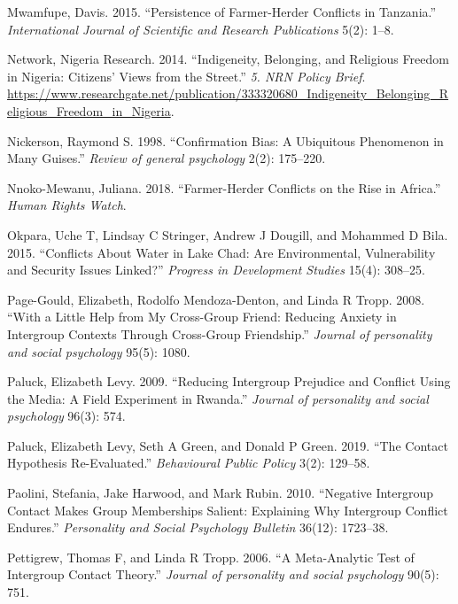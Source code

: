 \documentclass[11pt]{article}
\begin{document}
\begin{cslreferences}
\leavevmode\hypertarget{ref-mwamfupe2015persistence}{}%
Mwamfupe, Davis. 2015. ``Persistence of Farmer-Herder Conflicts in
Tanzania.'' \emph{International Journal of Scientific and Research
Publications} 5(2): 1--8.

\leavevmode\hypertarget{ref-nigeria2014freedom}{}%
Network, Nigeria Research. 2014. ``Indigeneity, Belonging, and Religious
Freedom in Nigeria: Citizens' Views from the Street.'' \emph{5. NRN
Policy Brief}.
\url{https://www.researchgate.net/publication/333320680_Indigeneity_Belonging_Religious_Freedom_in_Nigeria}.

\leavevmode\hypertarget{ref-nickerson1998confirmation}{}%
Nickerson, Raymond S. 1998. ``Confirmation Bias: A Ubiquitous Phenomenon
in Many Guises.'' \emph{Review of general psychology} 2(2): 175--220.

\leavevmode\hypertarget{ref-hrc2018farmer}{}%
Nnoko-Mewanu, Juliana. 2018. ``Farmer-Herder Conflicts on the Rise in
Africa.'' \emph{Human Rights Watch}.

\leavevmode\hypertarget{ref-okpara2015conflicts}{}%
Okpara, Uche T, Lindsay C Stringer, Andrew J Dougill, and Mohammed D
Bila. 2015. ``Conflicts About Water in Lake Chad: Are Environmental,
Vulnerability and Security Issues Linked?'' \emph{Progress in
Development Studies} 15(4): 308--25.

\leavevmode\hypertarget{ref-page2008little}{}%
Page-Gould, Elizabeth, Rodolfo Mendoza-Denton, and Linda R Tropp. 2008.
``With a Little Help from My Cross-Group Friend: Reducing Anxiety in
Intergroup Contexts Through Cross-Group Friendship.'' \emph{Journal of
personality and social psychology} 95(5): 1080.

\leavevmode\hypertarget{ref-paluck2009jsp}{}%
Paluck, Elizabeth Levy. 2009. ``Reducing Intergroup Prejudice and
Conflict Using the Media: A Field Experiment in Rwanda.'' \emph{Journal
of personality and social psychology} 96(3): 574.

\leavevmode\hypertarget{ref-paluck2019contact}{}%
Paluck, Elizabeth Levy, Seth A Green, and Donald P Green. 2019. ``The
Contact Hypothesis Re-Evaluated.'' \emph{Behavioural Public Policy}
3(2): 129--58.

\leavevmode\hypertarget{ref-paolini2010negative}{}%
Paolini, Stefania, Jake Harwood, and Mark Rubin. 2010. ``Negative
Intergroup Contact Makes Group Memberships Salient: Explaining Why
Intergroup Conflict Endures.'' \emph{Personality and Social Psychology
Bulletin} 36(12): 1723--38.

\leavevmode\hypertarget{ref-pettigrew2006meta}{}%
Pettigrew, Thomas F, and Linda R Tropp. 2006. ``A Meta-Analytic Test of
Intergroup Contact Theory.'' \emph{Journal of personality and social
psychology} 90(5): 751.


\end{cslreferences}
\end{document}
